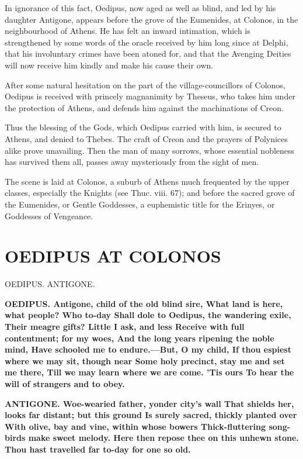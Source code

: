 \documentclass[11pt,letter]{book}
\begin{document}
\par  In ignorance of this fact, Oedipus, now aged as well as blind, and led by his daughter Antigone, appears before the grove of the Eumenides, at Colonos, in the neighbourhood of Athens. He has felt an inward intimation, which is strengthened by some words of the oracle received by him long since at Delphi, that his involuntary crimes have been atoned for, and that the Avenging Deities will now receive him kindly and make his cause their own.

\par  After some natural hesitation on the part of the village-councillors of Colonos, Oedipus is received with princely magnanimity by Theseus, who takes him under the protection of Athens, and defends him against the machinations of Creon.

\par  Thus the blessing of the Gods, which Oedipus carried with him, is secured to Athens, and denied to Thebes. The craft of Creon and the prayers of Polynices alike prove unavailing. Then the man of many sorrows, whose essential nobleness has survived them all, passes away mysteriously from the sight of men.

\par  The scene is laid at Colonos, a suburb of Athens much frequented by the upper classes, especially the Knights (see Thuc. viii. 67); and before the sacred grove of the Eumenides, or Gentle Goddesses, a euphemistic title for the Erinyes, or Goddesses of Vengeance.

\par  [page 261]
\section{OEDIPUS AT COLONOS}
\par  OEDIPUS. ANTIGONE.

\par \textbf{OEDIPUS. Antigone, child of the old blind sire, What land is here, what people? Who to-day Shall dole to Oedipus, the wandering exile, Their meagre gifts? Little I ask, and less Receive with full contentment; for my woes, And the long years ripening the noble mind, Have schooled me to endure.—But, O my child, If thou espiest where we may sit, though near Some holy precinct, stay me and set me there, Till we may learn where we are come. ’Tis ours To hear the will of strangers and to obey.}
\par 

\par \textbf{ANTIGONE. Woe-wearied father, yonder city’s wall That shields her, looks far distant; but this ground Is surely sacred, thickly planted over With olive, bay and vine, within whose bowers Thick-fluttering song-birds make sweet melody. Here then repose thee on this unhewn stone. Thou hast travelled far to-day for one so old.}
\par 
\end{document}

